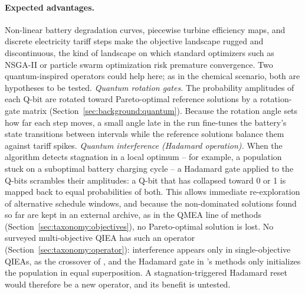 \paragraph{Expected advantages.}
Non-linear battery degradation curves, piecewise turbine efficiency
maps, and discrete electricity tariff steps make the objective
landscape rugged and discontinuous, the kind of landscape on which
standard optimizers such as NSGA-II or particle swarm optimization risk
premature convergence. Two quantum-inspired operators could help here;
as in the chemical scenario, both are hypotheses to be tested.
\emph{Quantum rotation gates.} The probability amplitudes of each Q-bit
are rotated toward Pareto-optimal reference solutions by a rotation-gate
matrix (Section~\ref{sec:background:quantum}). Because the rotation
angle sets how far each step moves, a small angle late in the run
fine-tunes the battery's state transitions between intervals while the
reference solutions balance them against tariff spikes.
\emph{Quantum interference (Hadamard operation).} When the algorithm
detects stagnation in a local optimum -- for example, a population stuck
on a suboptimal battery charging cycle -- a Hadamard gate applied to the
Q-bits scrambles their amplitudes: a Q-bit that has collapsed toward 0
or 1 is mapped back to equal probabilities of both. This allows
immediate re-exploration of alternative schedule windows, and because
the non-dominated solutions found so far are kept in an external
archive, as in the QMEA line of methods (Section~\ref{sec:taxonomy:objectives}),
no Pareto-optimal solution is lost. No surveyed multi-objective QIEA
has such an operator (Section~\ref{sec:taxonomy:operator}): interference
appears only in single-objective QIEAs, as the crossover of
\citet{narayanan1996qiga}, and the Hadamard gate in
\citet{olvera2023continuous}'s methods only initializes the population
in equal superposition. A stagnation-triggered Hadamard reset would
therefore be a new operator, and its benefit is untested.


